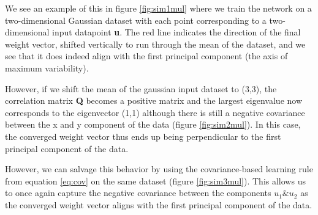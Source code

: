 \documentclass{article}
\begin{document}
We see an example of this in figure \ref{fig:sim1mul} where we train the network on a two-dimensional Gaussian dataset with each point corresponding to a two-dimensional input datapoint \textbf{u}. The red line indicates the direction of the final weight vector, shifted vertically to run through the mean of the dataset, and we see that it does indeed align with the first principal component (the axis of maximum variability).

However, if we shift the mean of the gaussian input dataset to (3,3), the correlation matrix \textbf{Q} becomes a positive matrix and the largest eigenvalue now corresponds to the eigenvector (1,1) although there is still a negative covariance between the x and y component of the data (figure \ref{fig:sim2mul}). In this case, the converged weight vector thus ends up being perpendicular to the first principal component of the data.

However, we can salvage this behavior by using the covariance-based learning rule from equation \ref{eq:cov} on the same dataset (figure \ref{fig:sim3mul}). This allows us to once again capture the negative covariance between the components $u_1 \& u_2$ as the converged weight vector aligns with the first principal component of the data.
\end{document}
